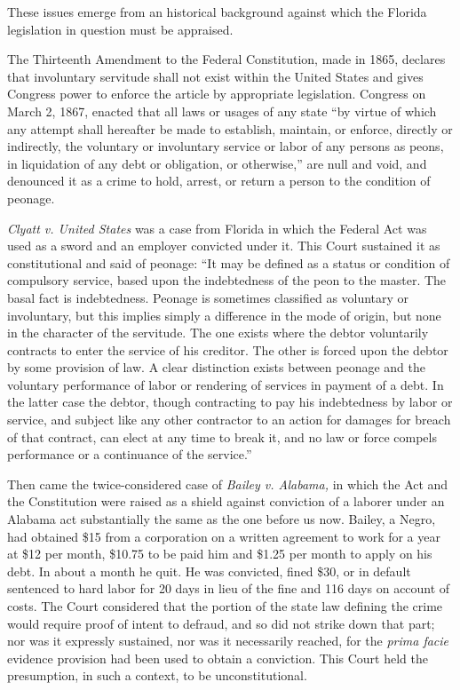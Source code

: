 \documentclass[
  letterpaper,
  11pt,
  DIV=9,
  openright]{scrbook}
\begin{document}
These issues emerge from an historical background against which the
Florida legislation in question must be appraised.

The Thirteenth Amendment to the Federal Constitution, made in 1865,
declares that involuntary servitude shall not exist within the United
States and gives Congress power to enforce the article by appropriate
legislation. Congress on March 2, 1867, enacted that all laws or usages
of any state ``by virtue of which any attempt shall hereafter be made to
establish, maintain, or enforce, directly or indirectly, the voluntary
or involuntary service or labor of any persons as peons, in liquidation
of any debt or obligation, or otherwise,'' are null and void, and
denounced it as a crime to hold, arrest, or return a person to the
condition of peonage.

\emph{Clyatt v. United States} was a case from Florida in which the
Federal Act was used as a sword and an employer convicted under it. This
Court sustained it as constitutional and said of peonage: ``It may be
defined as a status or condition of compulsory service, based upon the
indebtedness of the peon to the master. The basal fact is indebtedness.
Peonage is sometimes classified as voluntary or involuntary, but this
implies simply a difference in the mode of origin, but none in the
character of the servitude. The one exists where the debtor voluntarily
contracts to enter the service of his creditor. The other is forced upon
the debtor by some provision of law. A clear distinction exists between
peonage and the voluntary performance of labor or rendering of services
in payment of a debt. In the latter case the debtor, though contracting
to pay his indebtedness by labor or service, and subject like any other
contractor to an action for damages for breach of that contract, can
elect at any time to break it, and no law or force compels performance
or a continuance of the service.''

Then came the twice-considered case of \emph{Bailey v. Alabama,} in
which the Act and the Constitution were raised as a shield against
conviction of a laborer under an Alabama act substantially the same as
the one before us now. Bailey, a Negro, had obtained \$15 from a
corporation on a written agreement to work for a year at \$12 per month,
\$10.75 to be paid him and \$1.25 per month to apply on his debt. In
about a month he quit. He was convicted, fined \$30, or in default
sentenced to hard labor for 20 days in lieu of the fine and 116 days on
account of costs. The Court considered that the portion of the state law
defining the crime would require proof of intent to defraud, and so did
not strike down that part; nor was it expressly sustained, nor was it
necessarily reached, for the \emph{prima facie} evidence provision had
been used to obtain a conviction. This Court held the presumption, in
such a context, to be unconstitutional.
\end{document}
